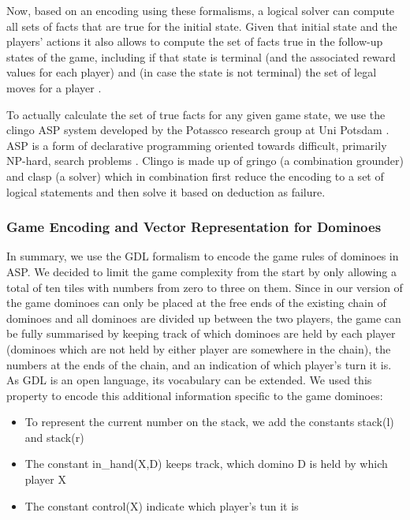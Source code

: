 \documentclass[12pt,a4paper]{article}
\begin{document}
Now, based on an encoding using these formalisms, a logical solver can compute all sets of facts that are true for the initial state. Given that initial state and the players’ actions it also allows to compute the set of facts true in the follow-up states of the game, including if that state is terminal (and the associated reward values for each player) and (in case the state is not terminal) the set of legal moves for a player \citep{love_general_2008}.

To actually calculate the set of true facts for any given game state, we use the clingo ASP system developed by the Potassco research group at Uni Potsdam \citet{gebser_clingo_2014}. ASP is a form of declarative programming oriented towards difficult, primarily NP-hard, search problems \citet{lifschitz_answer_2019}. Clingo is made up of gringo (a combination grounder) and clasp (a solver) which in combination first reduce the encoding to a set of logical statements and then solve it based on deduction as failure. 

\subsubsection{Game Encoding and Vector Representation for Dominoes}
\label{sec:game_encoding}
In summary, we use the GDL formalism to encode the game rules of dominoes in ASP.
We decided to limit the game complexity from the start by only allowing a total of ten tiles with numbers from zero to three on them. Since in our version of the game dominoes can only be placed at the free ends of the existing chain of dominoes and all dominoes are divided up between the two players, the game can be fully summarised by keeping track of which dominoes are held by each player (dominoes which are not held by either player are somewhere in the chain), the numbers at the ends of the chain, and an indication of which player’s turn it is. As GDL is an open language, its vocabulary can be extended. We used this property to encode this additional information specific to the game dominoes:

\begin{itemize}
\setlength\itemsep{0.01em}
  \item To represent the current number on the stack, we add the constants stack(l) and stack(r)
  \item The constant in\_hand(X,D) keeps track, which domino D is held by which player X
  \item The constant control(X) indicate which player’s tun it is
\end{itemize}
\end{document}
